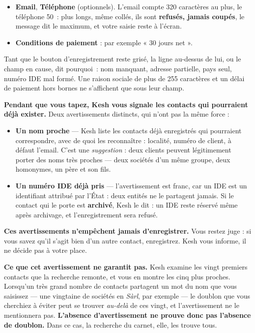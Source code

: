 \documentclass[a4paper,11pt,oneside]{article}
\begin{document}
\begin{itemize}
    \item \textbf{Email}, \textbf{Téléphone} (optionnels). L'email compte 320 caractères au plus, le téléphone 50~: plus longs, même collés, ils sont \textbf{refusés, jamais coupés}, le message dit le maximum, et votre saisie reste à l'écran.
    \item \textbf{Conditions de paiement} : par exemple « 30 jours net ».
\end{itemize}

Tant que le bouton d'enregistrement reste grisé, la ligne au-dessus de lui, ou le champ en cause, dit pourquoi~: nom manquant, adresse partielle, pays seul, numéro IDE mal formé. Une raison sociale de plus de 255 caractères et un délai de paiement hors bornes ne s'affichent que sous leur champ.

\begin{keshnote}
\textbf{Pendant que vous tapez, Kesh vous signale les contacts qui pourraient déjà
exister.} Deux avertissements distincts, qui n'ont pas la même force :

\begin{itemize}
    \item \textbf{Un nom proche} --- Kesh liste les contacts déjà enregistrés qui
    pourraient correspondre, avec de quoi les reconnaître : localité, numéro de
    client, à défaut l'email. C'est une \emph{suggestion} : deux clients peuvent
    légitimement porter des noms très proches --- deux sociétés d'un même groupe,
    deux homonymes, un père et son fils.
    \item \textbf{Un numéro IDE déjà pris} --- l'avertissement est franc, car un
    IDE est un identifiant attribué par l'État : deux entités ne le partagent
    jamais. Si le contact qui le porte est \textbf{archivé}, Kesh le dit : un IDE
    reste réservé même après archivage, et l'enregistrement sera refusé.
\end{itemize}

\textbf{Ces avertissements n'empêchent jamais d'enregistrer.} Vous restez juge :
si vous savez qu'il s'agit bien d'un autre contact, enregistrez. Kesh vous
informe, il ne décide pas à votre place.

\textbf{Ce que cet avertissement ne garantit pas.} Kesh examine les vingt
premiers contacts que la recherche remonte, et vous en montre les cinq plus
proches. Lorsqu'un très grand nombre de contacts partagent un mot du nom que
vous saisissez --- une vingtaine de sociétés en \emph{Sàrl}, par exemple ---
le doublon que vous cherchiez à éviter peut se trouver \emph{au-delà} de ces
vingt, et l'avertissement ne le mentionnera pas. \textbf{L'absence
d'avertissement ne prouve donc pas l'absence de doublon.} Dans ce cas, la
recherche du carnet, elle, les trouve tous.
\end{keshnote}
\end{document}
